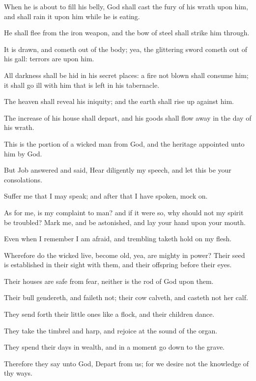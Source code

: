\Verse When he is about to fill his belly, God shall cast the fury of his wrath upon him, and shall rain it upon him while he is eating.

\Verse He shall flee from the iron weapon, and the bow of steel shall strike him through.

\Verse It is drawn, and cometh out of the body; yea, the glittering sword cometh out of his gall: terrors are upon him.

\Verse All darkness shall be hid in his secret places: a fire not blown shall consume him; it shall go ill with him that is left in his tabernacle.

\Verse The heaven shall reveal his iniquity; and the earth shall rise up against him.

\Verse The increase of his house shall depart, and his goods shall flow away in the day of his wrath.

\Verse This is the portion of a wicked man from God, and the heritage appointed unto him by God.


\Chapter
\Verse But Job answered and said, \Verse Hear diligently my speech, and let this be your consolations.

\Verse Suffer me that I may speak; and after that I have spoken, mock on.

\Verse As for me, is my complaint to man? and if it were so, why should not my spirit be troubled?  \Verse Mark me, and be astonished, and lay your hand upon your mouth.

\Verse Even when I remember I am afraid, and trembling taketh hold on my flesh.

\Verse Wherefore do the wicked live, become old, yea, are mighty in power?  \Verse Their seed is established in their sight with them, and their offspring before their eyes.

\Verse Their houses are safe from fear, neither is the rod of God upon them.

\Verse Their bull gendereth, and faileth not; their cow calveth, and casteth not her calf.

\Verse They send forth their little ones like a flock, and their children dance.

\Verse They take the timbrel and harp, and rejoice at the sound of the organ.

\Verse They spend their days in wealth, and in a moment go down to the grave.

\Verse Therefore they say unto God, Depart from us; for we desire not the knowledge of thy ways.

